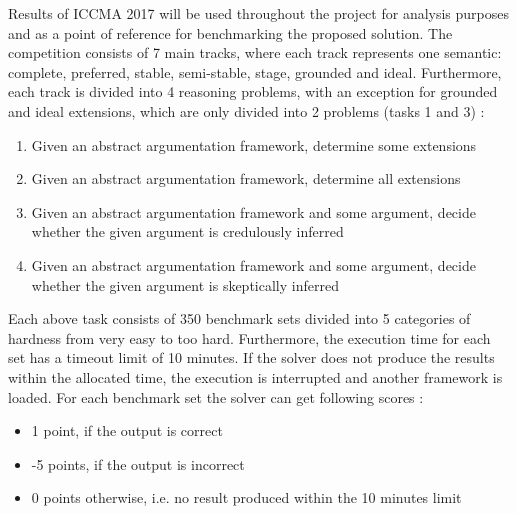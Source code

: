 Results of ICCMA 2017 will be used throughout the project for analysis purposes and as a point of reference for benchmarking the proposed solution. The competition consists of 7 main tracks, where each track represents one semantic: complete, preferred, stable, semi-stable, stage, grounded and ideal. Furthermore, each track is divided into 4 reasoning problems, with an exception for grounded and ideal extensions, which are only divided into 2 problems (tasks 1 and 3) \citep{ICCMA2017}:
\begin{enumerate}
	\item{Given an abstract argumentation framework, determine some extensions}
	\item{Given an abstract argumentation framework, determine all extensions}
	\item{Given an abstract argumentation framework and some argument, decide whether the given argument is credulously inferred}
	\item{Given an abstract argumentation framework and some argument, decide whether the given argument is skeptically inferred}
\end{enumerate}
Each above task consists of 350 benchmark sets divided into 5 categories of hardness from very easy to too hard. Furthermore, the execution time for each set has a timeout limit of 10 minutes. If the solver does not produce the results within the allocated time, the execution is interrupted and another framework is loaded. For each benchmark set the solver can get following scores \citep{results_sildes}:
\begin{itemize}
	\item{1 point, if the output is correct}
	\item{-5 points, if the output is incorrect}
	\item{0 points otherwise, i.e. no result produced within the 10 minutes limit}
\end{itemize}


